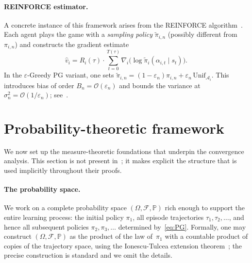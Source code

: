 \documentclass[a4paper,oneside,11pt]{report}
\newcommand{\Prob}{\mathbb{P}}
\newcommand{\calA}{\mathcal{A}}
\newcommand{\calF}{\mathcal{F}}
\numberwithin{theorem}{chapter}
\numberwithin{equation}{chapter}
\begin{document}
\paragraph{REINFORCE estimator.}
A concrete instance of this framework arises from the REINFORCE
algorithm~\cite{williams1992}. Each agent plays the game with a
\emph{sampling policy} $\tilde \pi_{i,n}$ (possibly different from
$\pi_{i,n}$) and constructs the gradient estimate
\begin{equation}
  \label{eq:REINFORCE}
  \hat v_i = R_i(\tau) \cdot \sum_{t=0}^{T(\tau)}
  \nabla_i\bigl(\log \tilde\pi_i(\alpha_{i,t} \mid s_t)\bigr).
\end{equation}
In the $\varepsilon$-Greedy PG variant, one sets
$\tilde\pi_{i,n} = (1-\varepsilon_n)\pi_{i,n} + \varepsilon_n \,
\mathrm{Unif}_{\calA_i}$. This introduces bias of order
$B_n = \mathcal{O}(\varepsilon_n)$ and bounds the variance at
$\sigma_n^2 = \mathcal{O}(1/\varepsilon_n)$;
see~\cite[Lemma~4]{giannou2022}.

\section{Probability-theoretic framework}
\label{sec:prob-framework}

We now set up the measure-theoretic foundations that underpin the
convergence analysis. This section is not present
in~\cite{giannou2022}; it makes explicit the structure that is used
implicitly throughout their proofs.

\paragraph{The probability space.}
We work on a complete probability space $(\Omega, \calF, \Prob)$ rich
enough to support the entire learning process: the initial policy
$\pi_1$, all episode trajectories $\tau_1, \tau_2, \ldots$, and hence
all subsequent policies $\pi_2, \pi_3, \ldots$ determined
by~\eqref{eq:PG}. Formally, one may construct $(\Omega, \calF, \Prob)$
as the product of the law of~$\pi_1$ with a countable product of copies
of the trajectory space, using the Ionescu-Tulcea extension
theorem~\cite{durrett2019}; the precise construction is standard and we
omit the details.
\end{document}
